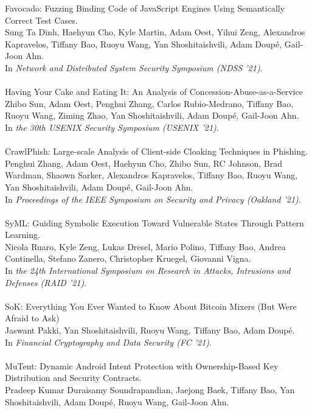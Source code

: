 Favocado: Fuzzing Binding Code of JavaScript Engines Using Semantically Correct Test Cases. \\
Sung Ta Dinh, Haehyun Cho, Kyle Martin, Adam Oest, Yihui Zeng, Alexandros Kapravelos, Tiffany Bao, Ruoyu Wang, Yan Shoshitaishvili, Adam Doup\'{e}, Gail-Joon Ahn. \\
In \emph{Network and Distributed System Security Symposium (NDSS '21)}.
\\\\
Having Your Cake and Eating It: An Analysis of Concession-Abuse-as-a-Service \\
Zhibo Sun, Adam Oest, Penghui Zhang, Carlos Rubio-Medrano, Tiffany Bao, Ruoyu Wang, Ziming Zhao, Yan Shoshitaishvili, Adam Doup\'{e}, Gail-Joon Ahn. \\
In \emph{the 30th USENIX Security Symposium (USENIX '21)}.
\\\\
CrawlPhish: Large-scale Analysis of Client-side Cloaking Techniques in Phishing. \\
Penghui Zhang, Adam Oest, Haehyun Cho, Zhibo Sun, RC Johnson, Brad Wardman, Shaown Sarker, Alexandros Kapravelos, 
Tiffany Bao, Ruoyu Wang, Yan Shoshitaishvili, Adam Doup\'{e}, Gail-Joon Ahn. \\
In \emph{Proceedings of the IEEE Symposium on Security and Privacy (Oakland '21)}.
\\\\
SyML: Guiding Symbolic Execution Toward Vulnerable States Through Pattern Learning. \\
Nicola Ruaro, Kyle Zeng, Lukas Dresel, Mario Polino, Tiffany Bao, Andrea Continella, Stefano Zanero, Christopher Kruegel, Giovanni Vigna. \\
In \emph{the 24th International Symposium on Research in Attacks, Intrusions and Defenses (RAID '21)}.
\\\\
SoK: Everything You Ever Wanted to Know About Bitcoin Mixers (But Were Afraid to Ask) \\
Jaswant Pakki, Yan Shoshitaishvili, Ruoyu Wang, Tiffany Bao, Adam Doup\'{e}. \\
In \emph{Financial Cryptography and Data Security (FC '21)}.
\\\\
MuTent: Dynamic Android Intent Protection with Ownership-Based Key Distribution and Security Contracts. \\
Pradeep Kumar Duraisamy Soundrapandian, Jaejong Baek, Tiffany Bao, Yan Shoshitaishvili, Adam Doup\'{e}, Ruoyu Wang, Gail-Joon Ahn. \\
